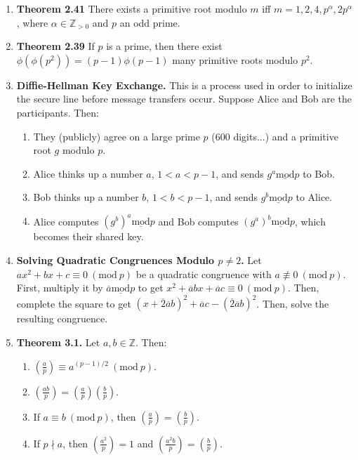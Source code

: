\documentclass[11pt]{article}
\theoremstyle{definition}
\theoremstyle{named}
\newcommand{\Mod}[1]{\ (\mathrm{mod}\ #1)}
\begin{document}
\begin{enumerate}
    \item \textbf{Theorem 2.41} There exists a primitive root modulo $m$ iff $m = 1,2,4, p^\alpha, 2p^\alpha$, where $\alpha \in \mathbb{Z}_{>0}$ and $p$ an odd prime. 
    \item \textbf{Theorem 2.39} If $p$ is a prime, then there exist $\phi(\phi(p^2)) = (p-1)\phi(p-1)$ many primitive roots modulo $p^2$. 
    \item \textbf{Diffie-Hellman Key Exchange. } This is a process used in order to initialize the secure line before message transfers occur. Suppose Alice and Bob are the participants. Then: 
    \begin{enumerate}
        \item They (publicly) agree on a large prime $p$ (600 digits...) and a primitive root $g$ modulo $p$. 
        \item Alice thinks up a number $a$, $1 < a < p-1$, and sends $g^a \underline{\textrm{mod}} p$ to Bob. 
        \item Bob thinks up a number $b$, $1 < b < p-1$, and sends $g^b \underline{\textrm{mod}} p$ to Alice. 
        \item Alice computes $(g^b)^a \underline{\textrm{mod}} p$ and Bob computes $(g^a)^b \underline{\textrm{mod}} p$, which becomes their shared key. 
    \end{enumerate}
    \item \textbf{Solving Quadratic Congruences Modulo $p \neq 2$. } Let $ax^2 + bx + c \equiv 0 \Mod{p}$ be a quadratic congruence with $a \not\equiv 0 \Mod{p}$. First, multiply it by $\overline{a} \underline{\textrm{mod}} p$ to get $x^2 + \overline{a}bx + \overline{a}c \equiv 0 \Mod{p}$. Then, complete the square to get $(x + \overline{2}\overline{a}b)^2 + \overline{a}c - (\overline{2}\overline{a}b)^2$. Then, solve the resulting congruence. 
    \item \textbf{Theorem 3.1. } Let $a,b \in \mathbb{Z}$. Then: 
    \begin{enumerate}
        \item $\left(\frac{a}{p}\right) \equiv a^{(p-1)/2} \Mod{p}$. 
        \item $\left(\frac{ab}{p}\right) = \left(\frac{a}{p}\right)\left(\frac{b}{p}\right)$. 
        \item If $a \equiv b \Mod{p}$, then $\left(\frac{a}{p}\right) = \left(\frac{b}{p}\right)$. 
        \item If $p \nmid a$, then $\left(\frac{a^2}{p}\right) = 1$ and $\left(\frac{a^2b}{p}\right) = \left(\frac{b}{p}\right)$. 

\end{enumerate}
\end{enumerate}
\end{document}

